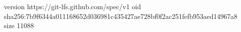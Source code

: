 version https://git-lfs.github.com/spec/v1
oid sha256:7b9f6344a011168652d036981c435427ae728bf0f2ac251fefb953aed14967a8
size 11088
